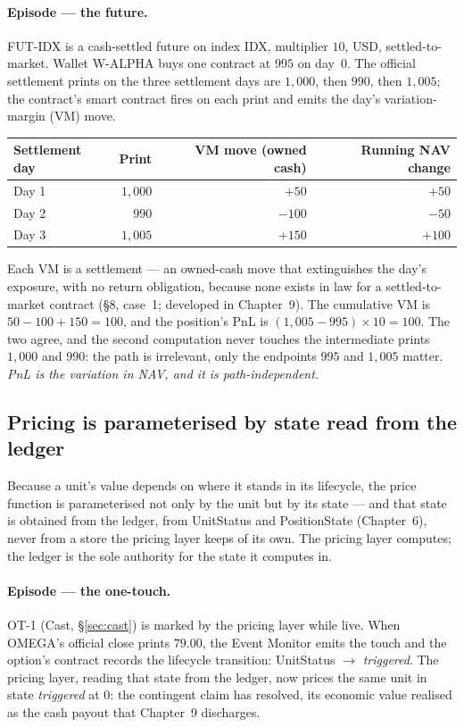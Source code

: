 \paragraph{Episode --- the future.}
FUT-IDX is a cash-settled future on index IDX, multiplier $10$, USD,
settled-to-market. Wallet W-ALPHA buys one contract at $995$ on day~0. The
official settlement prints on the three settlement days are $1{,}000$, then
$990$, then $1{,}005$; the contract's smart contract fires on each print and
emits the day's variation-margin (VM) move.

\begin{center}
\begin{tabular}{lrrr}
\toprule
Settlement day & Print & VM move (owned cash) & Running NAV change \\
\midrule
Day 1 & $1{,}000$ & $+50$ & $+50$ \\
Day 2 & $\phantom{0}990$ & $-100$ & $-50$ \\
Day 3 & $1{,}005$ & $+150$ & $+100$ \\
\bottomrule
\end{tabular}
\end{center}

Each VM is a settlement --- an owned-cash move that extinguishes the day's
exposure, with no return obligation, because none exists in law for a
settled-to-market contract (§8, case~1; developed in Chapter~9). The
cumulative VM is $50 - 100 + 150 = 100$, and the position's PnL is
$(1{,}005 - 995)\times 10 = 100$. The two agree, and the second computation
never touches the intermediate prints $1{,}000$ and $990$: the path is
irrelevant, only the endpoints $995$ and $1{,}005$ matter.
\emph{PnL is the variation in NAV, and it is path-independent.}

\subsection{Pricing is parameterised by state read from the ledger}\label{sec:pricing-state}

Because a unit's value depends on where it stands in its lifecycle, the price
function is parameterised not only by the unit but by its state --- and that
state is obtained from the ledger, from UnitStatus and PositionState
(Chapter~6), never from a store the pricing layer keeps of its own. The pricing
layer computes; the ledger is the sole authority for the state it computes in.

\paragraph{Episode --- the one-touch.}
OT-1 (Cast, \S\ref{sec:cast}) is marked  by the pricing layer while
live. When OMEGA's official close prints $79.00$, the Event Monitor
emits the touch and the option's contract records the lifecycle transition:
UnitStatus $\rightarrow$ \emph{triggered}. The pricing layer, reading that
state from the ledger, now prices the same unit in state \emph{triggered} at
$0$: the contingent claim has resolved, its economic value realised as the
cash payout that Chapter~9 discharges.


